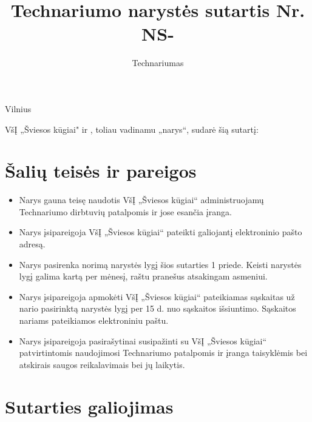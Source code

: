 \documentclass[paper=a4]{article}
\title{Technariumo narystės sutartis Nr. NS-\getproperty{agreement}{number}}
\author{Technariumas}
\begin{document}











\maketitle

\date{}		
\vskip12pt
Vilnius

VšĮ „Šviesos kūgiai" ir 
\textbf{}, toliau vadinamu „narys“, sudarė šią sutartį:
\section{Šalių teisės ir pareigos}

\begin{itemize}
\item Narys gauna teisę naudotis VšĮ „Šviesos kūgiai“ administruojamų Technariumo dirbtuvių patalpomis ir jose esančia įranga.
\item Narys įsipareigoja VšĮ „Šviesos kūgiai“ pateikti galiojantį elektroninio pašto adresą.
\item Narys pasirenka norimą narystės lygį šios sutarties 1 priede. Keisti narystės lygį galima kartą per mėnesį, raštu pranešus atsakingam asmeniui.   
\item Narys įsipareigoja apmokėti VšĮ „Šviesos kūgiai“ pateikiamas sąskaitas už nario pasirinktą narystės lygį per 15 d. nuo sąskaitos išsiuntimo. Sąskaitos nariams pateikiamos elektroniniu paštu.
\item Narys įsipareigoja pasirašytinai susipažinti su VšĮ „Šviesos kūgiai“ patvirtintomis naudojimosi Technariumo patalpomis ir įranga taisyklėmis bei atskirais saugos reikalavimais bei jų laikytis. 
\end{itemize}

\section{Sutarties galiojimas}
\end{document}
